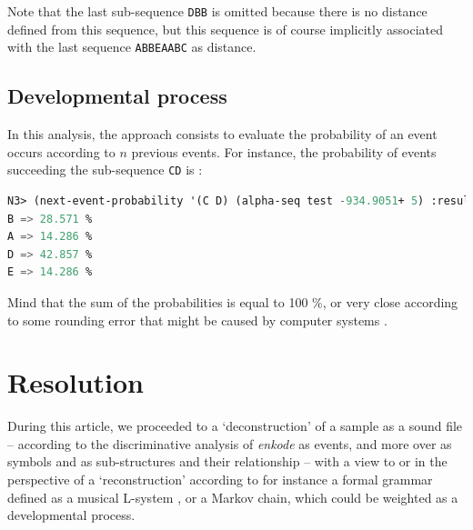 \smallskip

Note that the last sub-sequence \texttt{DBB} is omitted because there is no distance defined from this sequence, but this sequence is of course implicitly associated with the last sequence \texttt{ABBEAABC} as distance.

\subsection{Developmental process}

In this analysis, the approach consists to evaluate the probability of an event occurs according to $n$ previous events.
For instance, the probability of events succeeding the sub-sequence \texttt{CD} is :

\smallskip

\begin{lstlisting}[language=Lisp]
N3> (next-event-probability '(C D) (alpha-seq test -934.9051+ 5) :result :verbose)
B => 28.571 %
A => 14.286 %
D => 42.857 %
E => 14.286 %
\end{lstlisting}

\smallskip

Mind that the sum of the probabilities is equal to 100 \%,  or very close according to some rounding error that might be caused by computer systems \citep{re}.

\section{Resolution}
\label{mcres}

During this article, we proceeded to a `deconstruction' of a sample as a sound file -- according to the discriminative analysis of \textit{\textsl{enkode}} as events, and more over as symbols and as sub-structures and their relationship -- with a view to or in the perspective of a `reconstruction' according to for instance a formal grammar defined as a musical L-system \citep{ml}, or a Markov chain, which could be weighted as a developmental process.

